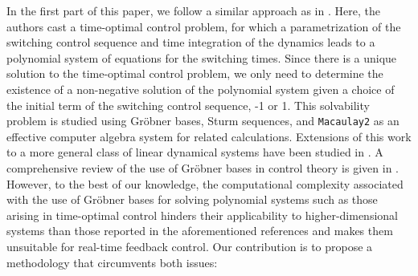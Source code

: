 \documentclass[11pt]{amsart}
\theoremstyle{definition}
\theoremstyle{remark}
\numberwithin{equation}{section}
\begin{document}
In the first part of this paper, we follow a similar approach as in \cite{nilpotentFeedback}. Here, the authors cast a time-optimal control problem, for which a parametrization of the switching control sequence and time integration of the dynamics leads to a polynomial system of equations for the switching times. Since there is a unique solution to the time-optimal control problem, we only need to determine the existence of a non-negative solution of the polynomial system given a choice of the initial term of the switching control sequence, -1 or 1. This solvability problem is studied using Gr\"obner bases, Sturm sequences, and \texttt{Macaulay2} \cite{M2} as an effective computer algebra system for related calculations. Extensions of this work to a more general class of linear dynamical systems have been studied in \cite{patil,PATIL20151,RauscherSawodnyChainIntegrators}. A comprehensive review of the use of Gr\"obner bases in control theory is given in \cite{georgbook}. However, to the best of our knowledge, the computational complexity associated with the use of Gr\"obner bases for solving polynomial systems such as those arising in time-optimal control hinders their applicability to higher-dimensional systems than those reported in the aforementioned references and makes them unsuitable for real-time feedback control. Our contribution is to propose a methodology that circumvents both issues:
\end{document}
